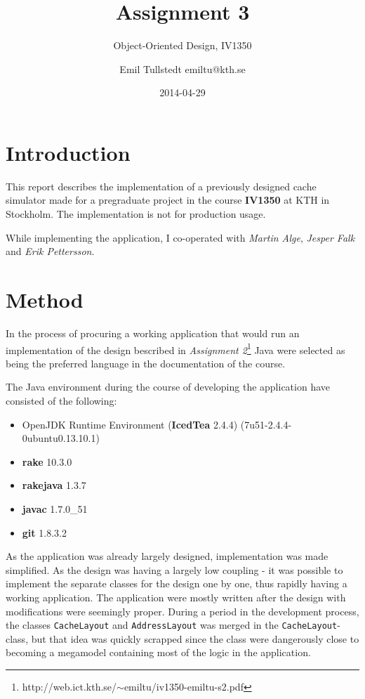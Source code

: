 \documentclass[a4paper]{scrreprt}
\title{Assignment 3}
\subtitle{Object-Oriented Design, IV1350}
\author{Emil Tullstedt emiltu@kth.se}
\date{2014-04-29}
\begin{document}
\maketitle

\tableofcontents %

\chapter{Introduction}
This report describes the implementation of a previously designed cache simulator made for a pregraduate project in the course \textbf{IV1350} at KTH in Stockholm. The implementation is not for production usage.

\begin{small}
While implementing the application, I co-operated with \textit{Martin Alge}, \textit{Jesper Falk} and \textit{Erik Pettersson}.
\end{small}

\chapter{Method}
In the process of procuring a working application that would run an implementation of the design bescribed in \textit{Assignment 2}\footnote{http://web.ict.kth.se/$\sim$emiltu/iv1350-emiltu-s2.pdf} Java were selected as being the preferred language in the documentation of the course.

The Java environment during the course of developing the application have consisted of the following:

\begin{itemize}
	\item OpenJDK Runtime Environment (\textbf{IcedTea} 2.4.4) (7u51-2.4.4-0ubuntu0.13.10.1)
	\item \textbf{rake} 10.3.0
	\item \textbf{rakejava} 1.3.7
	\item \textbf{javac} 1.7.0\_51
	\item \textbf{git} 1.8.3.2
\end{itemize}

As the application was already largely designed, implementation was made simplified. As the design was having a largely low coupling - it was possible to implement the separate classes for the design one by one, thus rapidly having a working application. The application were mostly written after the design with modifications were seemingly proper. During a period in the development process, the classes \texttt{CacheLayout} and \texttt{AddressLayout} was merged in the \texttt{CacheLayout}-class, but that idea was quickly scrapped since the class were dangerously close to becoming a megamodel containing most of the logic in the application.
\end{document}
